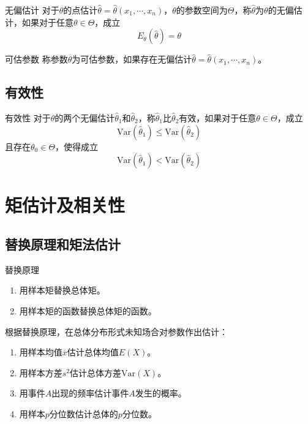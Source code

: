 \documentclass[lang = cn, scheme = chinese, thmcnt = section]{elegantbook}
\begin{document}
\begin{definition}{无偏估计}
	对于$\theta$的点估计$\hat{\theta}=\hat{\theta}(x_1,\cdots,x_n)$，$\theta$的参数空间为$\Theta$，称$\hat{\theta}$为$\theta$的无偏估计，如果对于任意$\theta\in\Theta$，成立
	$$
	E_{\theta}(\hat{\theta})=\theta
	$$
\end{definition}

\begin{definition}{可估参数}
	称参数$\theta$为可估参数，如果存在无偏估计$\hat{\theta}=\hat{\theta}(x_1,\cdots,x_n)$。
\end{definition}

\subsection{有效性}

\begin{definition}{有效性}
	对于$\theta$的两个无偏估计$\hat{\theta}_1$和$\hat{\theta}_2$，称$\hat{\theta}_1$比$\hat{\theta}_2$有效，如果对于任意$\theta\in\Theta$，成立
	$$
	\mathrm{Var}(\hat{\theta}_1)\le\mathrm{Var}(\hat{\theta}_2)
	$$
	且存在$\theta_0\in\Theta$，使得成立
	$$
	\mathrm{Var}(\hat{\theta}_1)<\mathrm{Var}(\hat{\theta}_2)
	$$
\end{definition}

\section{矩估计及相关性}

\subsection{替换原理和矩法估计}

\begin{definition}{替换原理}
	\begin{enumerate}
		\item 用样本矩替换总体矩。
		\item 用样本矩的函数替换总体矩的函数。
	\end{enumerate}	
	根据替换原理，在总体分布形式未知场合对参数作出估计：
	\begin{enumerate}
		\item 用样本均值$\overline{x}$估计总体均值$E(X)$。
		\item 用样本方差$s^2$估计总体方差$\mathrm{Var}(X)$。
		\item 用事件$A$出现的频率估计事件$A$发生的概率。
		\item 用样本$p$分位数估计总体的$p$分位数。
	\end{enumerate}
\end{definition}
\end{document}
